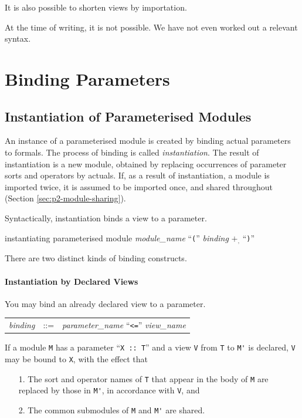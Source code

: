 \documentclass[a4paper]{memoir}
\begin{document}
It is also possible to shorten views by importation.

\begin{warning}
  At the time of writing, it is not possible. We have not even worked
  out a relevant syntax.
\end{warning}

\section{Binding Parameters}

\subsection{Instantiation of Parameterised Modules}
\label{sec:p2-module-instantiation}

An instance of a parameterised module is created by
binding actual parameters to formals. The process of binding is
called {\em instantiation}. 
The result of instantiation is a new module, obtained by
replacing occurrences of parameter sorts and operators by actuals.
If, as a result of instantiation, a module is imported twice,
it is assumed to be imported once, and shared throughout
(Section \ref{sec:p2-module-sharing}).

Syntactically, instantiation binds a view to a parameter.

\begin{bsyntax} instantiating parameterised module \Hline
\textit{module\_name} ``\texttt{(}'' \textit{binding} $+_,$ ``\texttt{)}''
\end{bsyntax}

There are two distinct kinds of binding constructs.

\paragraph{Instantiation by Declared Views}

You may bind an already declared view to a parameter.

\begin{tabular}{r c l}\index{\texttt{<=}}
  \textit{binding} &::=& \textit{parameter\_name} ``\verb|<=|'' \textit{view\_name}
\end{tabular}

If a module \verb|M| has a parameter ``\verb|X :: T|'' and a view
\verb|V| from \verb|T| to \verb|M'| is declared,
\verb|V| may be bound to \verb|X|, with the effect that
\begin{itemize}
\item[1.] The sort and operator names of \verb|T|
  that appear in the body of \verb|M| are replaced by
  those in \verb|M'|, in accordance with \verb|V|, and
\item[2.] The common submodules of \verb|M| and \verb|M'| are shared.
\end{itemize}
\end{document}
